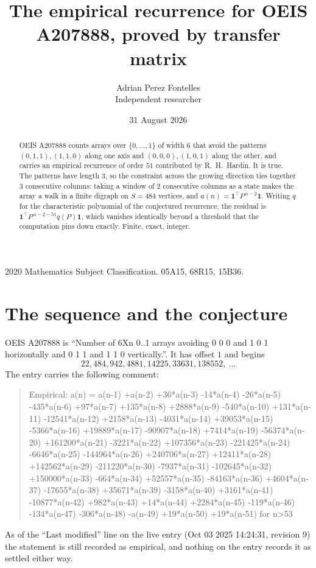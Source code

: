 \documentclass[11pt,a4paper]{article}
\title{The empirical recurrence for OEIS A207888, proved by transfer matrix}
\author{Adrian Perez Fontelles\\ \small Independent researcher}
\date{31 August 2026}
\theoremstyle{plain}
\theoremstyle{definition}
\begin{document}
\maketitle

\begin{abstract}
OEIS A207888 counts arrays over $\{0,\dots,1\}$ of width $6$ that avoid the patterns
$(0,1,1), (1,1,0)$ along one axis and $(0,0,0), (1,0,1)$ along the other, and carries an empirical recurrence of
order $51$ contributed by R.~H.~Hardin. It is true. The patterns have length $3$, so
the constraint across the growing direction ties together $3$ consecutive columns: taking a
window of $2$ consecutive columns as a state makes the array a walk in a finite digraph
on $S=484$ vertices, and $a(n)=\mathbf{1}^{\!\top}P^{\,n-2}\mathbf{1}$. Writing $q$
for the characteristic polynomial of the conjectured recurrence, the residual is
$\mathbf{1}^{\!\top}P^{\,n-2-51}q(P)\mathbf{1}$, which vanishes identically
beyond a threshold that the computation pins down exactly. Finite, exact, integer.
\end{abstract}

\noindent\small 2020 Mathematics Subject Classification. 05A15, 68R15, 15B36.\normalsize

\section{The sequence and the conjecture}

OEIS A207888 is ``Number of 6Xn 0..1 arrays avoiding 0 0 0 and 1 0 1 horizontally and 0 1 1 and 1 1 0 vertically.''. It has offset
$1$ and begins
\[
22, 484, 942, 4881, 14225, 33631, 138552,\ \dots
\]
The entry carries the following comment:
\begin{quote}\small
Empirical: a(n) = a(n-1) +a(n-2) +36*a(n-3) -14*a(n-4) -26*a(n-5) -435*a(n-6) +97*a(n-7) +135*a(n-8) +2888*a(n-9) -540*a(n-10) +131*a(n-11) -12541*a(n-12) +2158*a(n-13) -4031*a(n-14) +39053*a(n-15) -5366*a(n-16) +19889*a(n-17) -90907*a(n-18) +7414*a(n-19) -56374*a(n-20) +161200*a(n-21) -3221*a(n-22) +107356*a(n-23) -221425*a(n-24) -6646*a(n-25) -144964*a(n-26) +240706*a(n-27) +12411*a(n-28) +142562*a(n-29) -211220*a(n-30) -7937*a(n-31) -102645*a(n-32) +150000*a(n-33) -664*a(n-34) +52557*a(n-35) -84163*a(n-36) +4604*a(n-37) -17655*a(n-38) +35671*a(n-39) -3158*a(n-40) +3161*a(n-41) -10877*a(n-42) +982*a(n-43) +14*a(n-44) +2284*a(n-45) -119*a(n-46) -134*a(n-47) -306*a(n-48) -a(n-49) +19*a(n-50) +19*a(n-51) for n>53
\end{quote}
As of the ``Last modified'' line on the live entry (Oct 03 2025 14:24:31, revision
9) the statement is still recorded as empirical, and nothing on the entry
records it as settled either way.
\end{document}
